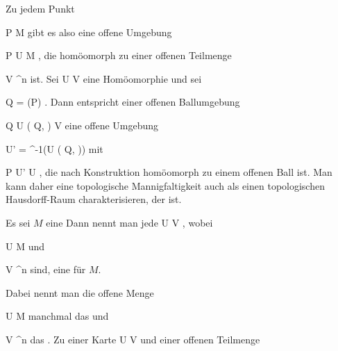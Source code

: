 Zu jedem Punkt

\mavergleichskette
{\vergleichskette
{P
}
{ \in }{ M
}
{  }{
}
{    }{
}
{   }{
}
}
{}{}{}
gibt es also eine offene Umgebung

\mavergleichskette
{\vergleichskette
{P
}
{ \in }{ U
}
{ \subseteq }{ M
}
{    }{
}
{   }{
}
}
{}{}{,}
die homöomorph zu einer offenen Teilmenge

\mavergleichskette
{\vergleichskette
{V
}
{ \subseteq }{ \R^n
}
{  }{
}
{    }{
}
{   }{
}
}
{}{}{}
ist. Sei
\maabbdisp {\varphi} {U} {V
} {}
eine Homöomorphie und sei

\mavergleichskette
{\vergleichskette
{ Q
}
{ = }{ \varphi(P)
}
{  }{
}
{    }{
}
{   }{
}
}
{}{}{.}
Dann entspricht einer offenen Ballumgebung

\mavergleichskette
{\vergleichskette
{Q
}
{ \in }{ U \left(  Q, \epsilon  \right)
}
{ \subseteq }{ V
}
{    }{
}
{   }{
}
}
{}{}{}
eine offene Umgebung

\mavergleichskette
{\vergleichskette
{ U'
}
{ = }{  \varphi^{-1}(U \left(  Q, \epsilon  \right))
}
{  }{
}
{    }{
}
{   }{
}
}
{}{}{}
mit

\mavergleichskette
{\vergleichskette
{P
}
{ \in }{ U'
}
{ \subseteq }{ U
}
{    }{
}
{   }{
}
}
{}{}{,}
die nach Konstruktion homöomorph zu einem offenen Ball ist. Man kann daher eine topologische Mannigfaltigkeit auch als einen topologischen Hausdorff-Raum charakterisieren, der  {} ist.

{}
{

Es sei $M$ eine
Dann nennt man jede
\maabbdisp {\varphi} { U } { V
} {,}
wobei

\mavergleichskette
{\vergleichskette
{ U
}
{ \subseteq }{ M
}
{  }{
}
{    }{
}
{   }{
}
}
{}{}{}
und

\mavergleichskette
{\vergleichskette
{ V
}
{ \subseteq }{ \R^n
}
{  }{
}
{    }{
}
{   }{
}
}
{}{}{}
sind, eine
 {} {}
 für $M$.

}

Dabei nennt man die offene Menge

\mavergleichskette
{\vergleichskette
{ U
}
{ \subseteq }{ M
}
{  }{
}
{    }{
}
{   }{
}
}
{}{}{}
manchmal das  {} und

\mavergleichskette
{\vergleichskette
{ V
}
{ \subseteq }{ \R^n
}
{  }{
}
{    }{
}
{   }{
}
}
{}{}{}
das  {.} Zu einer Karte
\maabbdisp {\varphi} {U} {V
} {}
und einer offenen Teilmenge

